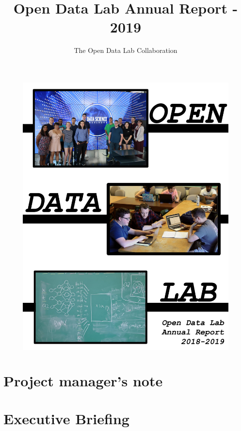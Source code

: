 \documentclass[12pt,letterpaper]{report} %
\title{Open Data Lab Annual Report - 2019}
\author{The Open Data Lab Collaboration}
\begin{document}

\cleardoublepage
\maketitle

\cleardoublepage
\begin{figure}[!hbtp]
\includegraphics[width=\textwidth]{cover-images/ODLFrontCover-nontrans}
\end{figure}

\newpage

\chapter*{Project manager's note}   %
\chapter*{Executive Briefing}
\tableofcontents
\listoffigures
\listoftables
\end{document}
